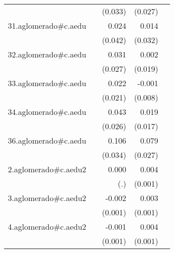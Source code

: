 {\begin{longtable}{l*{4}{D{.}{.}{-1}}}
            &                     &     (0.033)         &     (0.027)         &                     \\
\addlinespace
31.aglomerado#c.aedu&                     &       0.024         &       0.014         &                     \\
            &                     &     (0.042)         &     (0.032)         &                     \\
\addlinespace
32.aglomerado#c.aedu&                     &       0.031         &       0.002         &                     \\
            &                     &     (0.027)         &     (0.019)         &                     \\
\addlinespace
33.aglomerado#c.aedu&                     &       0.022         &      -0.001         &                     \\
            &                     &     (0.021)         &     (0.008)         &                     \\
\addlinespace
34.aglomerado#c.aedu&                     &       0.043         &       0.019         &                     \\
            &                     &     (0.026)         &     (0.017)         &                     \\
\addlinespace
36.aglomerado#c.aedu&                     &       0.106\sym{**} &       0.079\sym{**} &                     \\
            &                     &     (0.034)         &     (0.027)         &                     \\
\addlinespace
2.aglomerado#c.aedu2&                     &       0.000         &       0.004\sym{***}&                     \\
            &                     &         (.)         &     (0.001)         &                     \\
\addlinespace
3.aglomerado#c.aedu2&                     &      -0.002         &       0.003\sym{**} &                     \\
            &                     &     (0.001)         &     (0.001)         &                     \\
\addlinespace
4.aglomerado#c.aedu2&                     &      -0.001         &       0.004\sym{***}&                     \\
            &                     &     (0.001)         &     (0.001)         &                     \\

\end{longtable}}
